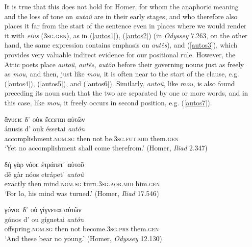 It is true that this does not hold for Homer, for whom the anaphoric meaning and the loss of tone on \textit{autoû} are in their early stages, and who therefore also places it far from the start of the sentence even in places where we would render it with \emph{eius} (\textsc{3sg.gen}), as in (\ref{autos1}), (\ref{autos2}) (in \textit{Odyssey} 7.263, on the other hand, the same expression contains emphasis on \textit{autês}), and (\ref{autos3}), which provides very valuable indirect evidence for our positional rule. However, the Attic poets place \textit{autoû}, \textit{autês}, \textit{autôn} before their governing nouns just as freely as \textit{mou}, and then, just like \textit{mou}, it is often near to the start of the clause, e.g. (\ref{autos4}), (\ref{autos5}), and (\ref{autos6}). Similarly, \textit{autoû}, like \textit{mou}, is also found preceding its noun such that the two are separated by one or more words, and in this case, like \textit{mou}, it freely occurs in second position, e.g. (\ref{autos7}). 

\begin{exe}
\ex ἄνυϲιϲ δ᾽ οὐκ ἔϲϲεται αὐτῶν\\
\gll ánusis d' ouk éssetai \emph{autôn}\\
accomplishment.\textsc{nom.sg} then not be.\textsc{3sg.fut.mid} them.\textsc{gen}\\
\trans `Yet no accomplishment shall come therefrom.' (Homer, \textit{Iliad} 2.347)
\label{autos1}
\end{exe}

\begin{exe}
\ex δὴ γὰρ νόοϲ ἐτράπετ᾽ αὐτοῦ\\
\gll dḕ gàr nóos etrápet' \emph{autoû}\\
exactly then mind.\textsc{nom.sg} turn.\textsc{3sg.aor.mid} him.\textsc{gen}\\
\trans `For lo, his mind was turned.' (Homer, \textit{Iliad} 17.546)
\label{autos2}
\end{exe}

\begin{exe}
\ex γόνοϲ δ᾽ οὐ γίγνεται αὐτῶν\\
\gll gónos d' ou gígnetai \emph{autôn}\\
offspring.\textsc{nom.sg} then not become.\textsc{3sg.prs} them.\textsc{gen}\\
\trans `And these bear no young.' (Homer, \textit{Odyssey} 12.130)
\label{autos3}
\end{exe}

